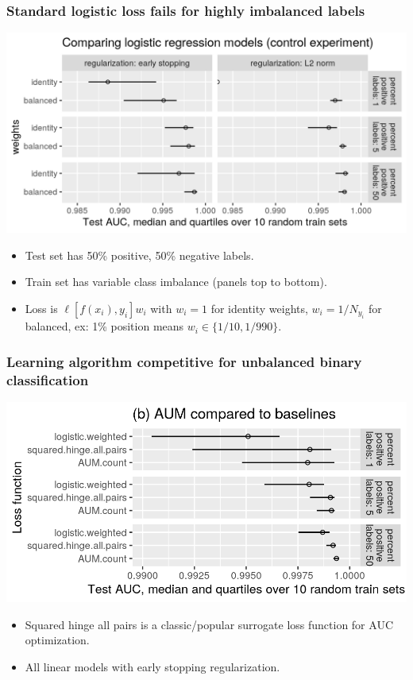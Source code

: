 \documentclass{beamer}
\begin{document}
\begin{frame}
  \frametitle{Standard logistic loss fails for highly imbalanced labels}

 \includegraphics[width=\textwidth]{figure-unbalanced-grad-desc-logistic.png}

 \begin{itemize}
 \item Test set has 50\% positive, 50\% negative labels.
 \item Train set has variable class imbalance (panels top to
   bottom).
 \item Loss is $\ell[f(x_i), y_i]w_i$ with $w_i=1$ for identity
   weights, $w_i=1/N_{y_i}$ for balanced, ex: 1\% position means
   $w_i\in\{1/10,1/990\}$.
 \end{itemize}

\end{frame}

\begin{frame}
  \frametitle{Learning algorithm competitive for unbalanced binary classification}

 \includegraphics[width=\textwidth]{figure-unbalanced-grad-desc.png}

 \begin{itemize}
 \item Squared hinge all pairs is a classic/popular surrogate loss function
   for AUC optimization.
 \item All linear models with early stopping regularization.
 \end{itemize}

\end{frame}
\end{document}

